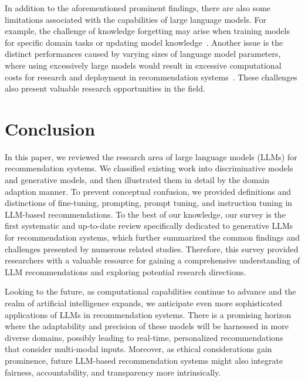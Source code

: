 \documentclass[sn-mathphys-num]{sn-jnl}%
\theoremstyle{thmstyleone}%
\theoremstyle{thmstyletwo}%
\theoremstyle{thmstylethree}%
\begin{document}

In addition to the aforementioned prominent findings, there are also some limitations associated with the capabilities of large language models. For example, the challenge of knowledge forgetting may arise when training models for specific domain tasks or updating model knowledge~\cite{jang2022towards}. Another issue is the distinct performances caused by varying sizes of language model parameters, where using excessively large models would result in excessive computational costs for research and deployment in recommendation systems~\cite{DBLP:journals/corr/abs-2305-08845}. These challenges also present valuable research opportunities in the field.

\section{Conclusion}

In this paper, we reviewed the research area of large language models (LLMs) for recommendation systems. We classified existing work into discriminative models and generative models, and then illustrated them in detail by the domain adaption manner. To prevent conceptual confusion, we provided definitions and distinctions of fine-tuning, prompting, prompt tuning, and instruction tuning in LLM-based recommendations. To the best of our knowledge, our survey is the first systematic and up-to-date review specifically dedicated to generative LLMs for recommendation systems, which further summarized the common findings and challenges presented by numerous related studies. Therefore, this survey provided researchers with a valuable resource for gaining a comprehensive understanding of LLM recommendations and exploring potential research directions.

Looking to the future, as computational capabilities continue to advance and the realm of artificial intelligence expands, we anticipate even more sophisticated applications of LLMs in recommendation systems. There is a promising horizon where the adaptability and precision of these models will be harnessed in more diverse domains, possibly leading to real-time, personalized recommendations that consider multi-modal inputs. Moreover, as ethical considerations gain prominence, future LLM-based recommendation systems might also integrate fairness, accountability, and transparency more intrinsically.
\end{document}
